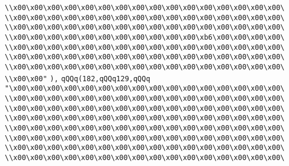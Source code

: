 \verb|\\x00\x00\x00\x00\x00\x00\x00\x00\x00\x00\x00\x00\x00\x00\x00\x00\|\newline
\verb|\\x00\x00\x00\x00\x00\x00\x00\x00\x00\x00\x00\x00\x00\x00\x00\x00\|\newline
\verb|\\x00\x00\x00\x00\x00\x00\x00\x00\x00\x00\x00\x00\x00\x00\x00\x00\|\newline
\verb|\\x00\x00\x00\x00\x00\x00\x00\x00\x00\x00\x00\xb6\x00\x00\x00\x00\|\newline
\verb|\\x00\x00\x00\x00\x00\x00\x00\x00\x00\x00\x00\x00\x00\x00\x00\x00\|\newline
\verb|\\x00\x00\x00\x00\x00\x00\x00\x00\x00\x00\x00\x00\x00\x00\x00\x00\|\newline
\verb|\\x00\x00\x00\x00\x00\x00\x00\x00\x00\x00\x00\x00\x00\x00\x00\x00\|\newline
\verb|\\x00\x00"|\newline
\verb|),|\newline
\verb|qQQq(182,qQQq129,qQQq|\newline
\verb|"\x00\x00\x00\x00\x00\x00\x00\x00\x00\x00\x00\x00\x00\x00\x00\x00\|\newline
\verb|\\x00\x00\x00\x00\x00\x00\x00\x00\x00\x00\x00\x00\x00\x00\x00\x00\|\newline
\verb|\\x00\x00\x00\x00\x00\x00\x00\x00\x00\x00\x00\x00\x00\x00\x00\x00\|\newline
\verb|\\x00\x00\x00\x00\x00\x00\x00\x00\x00\x00\x00\x00\x00\x00\x00\x00\|\newline
\verb|\\x00\x00\x00\x00\x00\x00\x00\x00\x00\x00\x00\x00\x00\x00\x00\x00\|\newline
\verb|\\x00\x00\x00\x00\x00\x00\x00\x00\x00\x00\x00\x00\x00\x00\x00\x00\|\newline
\verb|\\x00\x00\x00\x00\x00\x00\x00\x00\x00\x00\x00\x00\x00\x00\x00\x00\|\newline
\verb|\\x00\x00\x00\x00\x00\x00\x00\x00\x00\x00\x00\x00\x00\x00\x00\x00\|\newline
